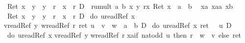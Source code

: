 \begin{isabellebody}
\begin{isamarkuptxt}
      \begin{isabelle}%
{\isasymturnstile}\ Ret\ {\isacharparenleft}x\ {\isasymnoteq}\ y\ {\isasymand}\ y\ {\isasymnoteq}\ r\ {\isasymand}\ x\ {\isasymnoteq}\ r{\isacharparenright}\ {\isasymlongrightarrow}\isactrlsub D\ {\isacharbrackleft}{\isacharhash}\ rumult\ a\ b\ x\ y\ r{\isacharbrackright}{\isacharparenleft}{\isasymlambda}x{\isachardot}\ Ret\ {\isacharparenleft}x\ {\isacharequal}\ a\ {\isacharasterisk}\ b{\isacharparenright}{\isacharparenright}\isanewline
\ {}{\isachardot}\ {\isasymAnd}xa\ xaa\ xb{\isachardot}\isanewline
{}\ {\isacharparenleft}Ret\ {\isacharparenleft}x\ {\isasymnoteq}\ y\ {\isasymand}\ y\ {\isasymnoteq}\ r\ {\isasymand}\ x\ {\isasymnoteq}\ r{\isacharparenright}\ {\isasymand}\isactrlsub D\isanewline
{}\ {\isacharparenleft}do\ {\isacharbraceleft}u{\isasymleftarrow}readRef\ x{\isacharsemicolon}\isanewline
{}v{\isasymleftarrow}readRef\ y{\isacharsemicolon}\ w{\isasymleftarrow}readRef\ r{\isacharsemicolon}\ ret\ {\isacharparenleft}u\ {\isacharasterisk}\ v\ {\isacharplus}\ w\ {\isacharequal}\ a\ {\isacharasterisk}\ b{\isacharparenright}{\isacharbraceright}{\isacharparenright}{\isacharparenright}\ {\isasymand}\isactrlsub D\isanewline
{}\ {\isacharparenleft}do\ {\isacharbraceleft}u{\isasymleftarrow}readRef\ x{\isacharsemicolon}\ ret\ {\isacharparenleft}{}\ {\isacharless}\ u{\isacharparenright}{\isacharbraceright}{\isacharparenright}\ {\isasymlongrightarrow}\isactrlsub D\isanewline
{}\ do\ {\isacharbraceleft}u{\isasymleftarrow}readRef\ x{\isacharsemicolon}\isanewline
{}v{\isasymleftarrow}readRef\ y{\isacharsemicolon}\isanewline
{}w{\isasymleftarrow}readRef\ r{\isacharsemicolon}\isanewline
{}xa{\isasymleftarrow}if\ nat{\isacharunderscore}odd\ u\ then\ r\ {\isacharcolon}{\isacharequal}\ w\ {\isacharplus}\ v\ else\ ret\ {\isacharparenleft}{\isacharparenright}{\isacharsemicolon}\isanewline

\end{isabelle}
\end{isamarkuptxt}
\end{isabellebody}
